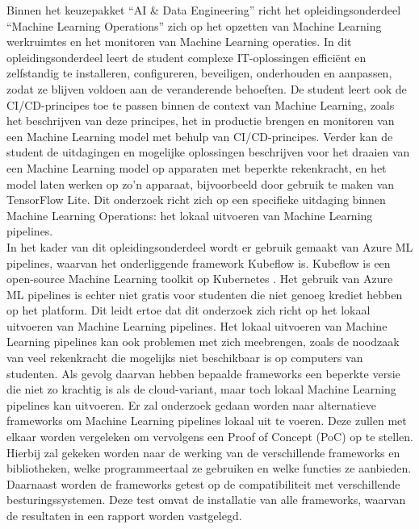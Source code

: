 Binnen het keuzepakket ``AI \& Data Engineering'' richt het opleidingsonderdeel ``Machine Learning Operations'' zich op het opzetten van Machine Learning werkruimtes en het monitoren van Machine Learning operaties. In dit opleidingsonderdeel leert de student complexe IT-oplossingen efficiënt en zelfstandig te installeren, configureren, beveiligen, onderhouden en aanpassen, zodat ze blijven voldoen aan de veranderende behoeften. De student leert ook de CI/CD-principes toe te passen binnen de context van Machine Learning, zoals het beschrijven van deze principes, het in productie brengen en monitoren van een Machine Learning model met behulp van CI/CD-principes. Verder kan de student de uitdagingen en mogelijke oplossingen beschrijven voor het draaien van een Machine Learning model op apparaten met beperkte rekenkracht, en het model laten werken op zo'n apparaat, bijvoorbeeld door gebruik te maken van TensorFlow Lite.
Dit onderzoek richt zich op een specifieke uitdaging binnen Machine Learning Operations: het lokaal uitvoeren van Machine Learning pipelines.\\

In het kader van dit opleidingsonderdeel wordt er gebruik gemaakt van Azure ML pipelines, waarvan het onderliggende framework Kubeflow is. Kubeflow is een open-source Machine Learning toolkit op Kubernetes \autocite{Kubeflow2021}. Het gebruik van Azure ML pipelines is echter niet gratis voor studenten die niet genoeg krediet hebben op het platform. Dit leidt ertoe dat dit onderzoek zich richt op het lokaal uitvoeren van Machine Learning pipelines.
Het lokaal uitvoeren van Machine Learning pipelines kan ook problemen met zich meebrengen, zoals de noodzaak van veel rekenkracht die mogelijks niet beschikbaar is op computers van studenten. Als gevolg daarvan hebben bepaalde frameworks een beperkte versie die niet zo krachtig is als de cloud-variant, maar toch lokaal Machine Learning pipelines kan uitvoeren.
Er zal onderzoek gedaan worden naar alternatieve frameworks om Machine Learning pipelines lokaal uit te voeren. Deze zullen met elkaar worden vergeleken om vervolgens een Proof of Concept (PoC) op te stellen. Hierbij zal gekeken worden naar de werking van de verschillende frameworks en bibliotheken, welke programmeertaal ze gebruiken en welke functies ze aanbieden. Daarnaast worden de frameworks getest op de compatibiliteit met verschillende besturingssystemen. Deze test omvat de installatie van alle frameworks, waarvan de resultaten in een rapport worden vastgelegd.\\

